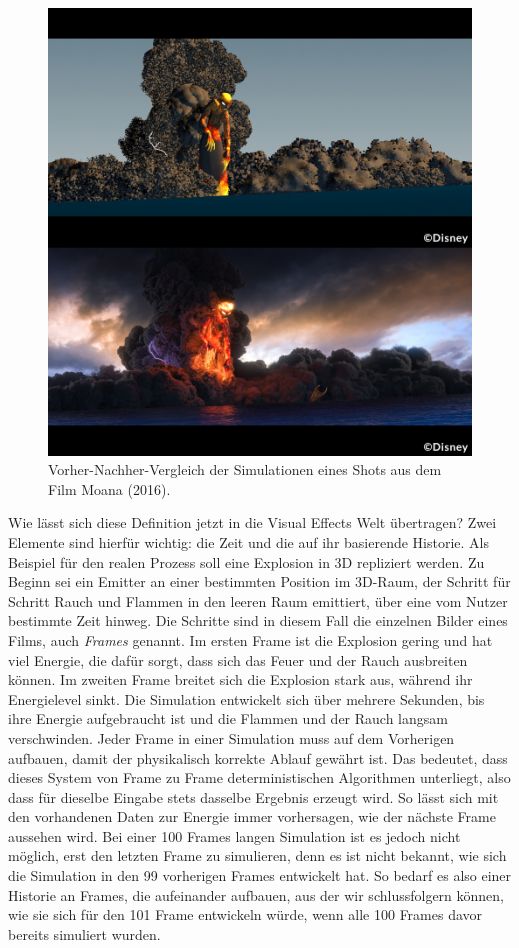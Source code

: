 \begin{figure}[ht]
    \centering
    \includegraphics[width=12cm]{bilder/vaiana.jpg}
    \caption{Vorher-Nachher-Vergleich der Simulationen eines Shots aus dem Film \glqq Moana\grqq{} (2016).}
    \label{fig:moana}
\end{figure}



Wie lässt sich diese Definition jetzt in die Visual Effects Welt übertragen? Zwei Elemente sind hierfür wichtig: die Zeit und die auf ihr basierende Historie. Als Beispiel für den realen Prozess soll eine Explosion in 3D repliziert werden. Zu Beginn sei ein Emitter an einer bestimmten Position im 3D-Raum, der Schritt für Schritt Rauch und Flammen in den leeren Raum emittiert, über eine vom Nutzer bestimmte Zeit hinweg. Die Schritte sind in diesem Fall die einzelnen Bilder eines Films, auch \textit{Frames} genannt. Im ersten Frame ist die Explosion gering und hat viel Energie, die dafür sorgt, dass sich das Feuer und der Rauch ausbreiten können. Im zweiten Frame breitet sich die Explosion stark aus, während ihr Energielevel sinkt. Die Simulation entwickelt sich über mehrere Sekunden, bis ihre Energie aufgebraucht ist und die Flammen und der Rauch langsam verschwinden. Jeder Frame in einer Simulation muss auf dem Vorherigen aufbauen, damit der physikalisch korrekte Ablauf gewährt ist. Das bedeutet, dass dieses System von Frame zu Frame deterministischen Algorithmen unterliegt, also dass für dieselbe Eingabe stets dasselbe Ergebnis erzeugt wird. So lässt sich mit den vorhandenen Daten zur Energie immer vorhersagen, wie der nächste Frame aussehen wird. Bei einer 100 Frames langen Simulation ist es jedoch nicht möglich, erst den letzten Frame zu simulieren, denn es ist nicht bekannt, wie sich die Simulation in den 99 vorherigen Frames entwickelt hat. So bedarf es also einer Historie an Frames, die aufeinander aufbauen, aus der wir schlussfolgern können, wie sie sich für den 101 Frame entwickeln würde, wenn alle 100 Frames davor bereits simuliert wurden.\\

